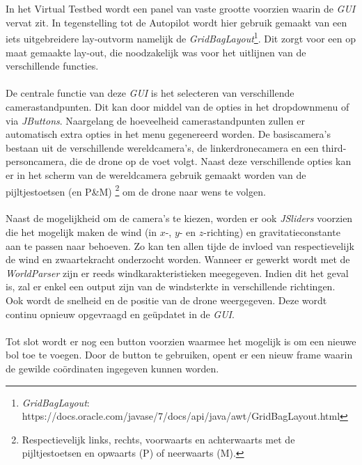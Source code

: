 \\
\\
In het Virtual Testbed wordt een panel van vaste grootte voorzien waarin de \textit{GUI} vervat zit. In tegenstelling tot de Autopilot wordt hier gebruik gemaakt van een iets uitgebreidere lay-outvorm namelijk de \textit{GridBagLayout}\footnote{\textit{GridBagLayout}: https://docs.oracle.com/javase/7/docs/api/java/awt/GridBagLayout.html}. Dit zorgt voor een op maat gemaakte lay-out, die noodzakelijk was voor het uitlijnen van de verschillende functies. 
\\
\\
De centrale functie van deze \textit{GUI} is het selecteren van verschillende camerastandpunten. Dit kan door middel van de opties in het dropdownmenu of via \textit{JButtons}. Naargelang de hoeveelheid camerastandpunten zullen er automatisch extra opties in het menu gegenereerd worden. De basiscamera's bestaan uit de verschillende wereldcamera's, de linkerdronecamera en een third-personcamera, die de drone op de voet volgt. Naast deze verschillende opties kan er in het scherm van de wereldcamera gebruik gemaakt worden van de pijltjestoetsen (en P\&M) \footnote{Respectievelijk links, rechts, voorwaarts en achterwaarts met de pijltjestoetsen en opwaarts (P) of neerwaarts (M).} om de drone naar wens te volgen. 
\\
\\
Naast de mogelijkheid om de camera's te kiezen, worden er ook \textit{JSliders} voorzien die het mogelijk maken de wind (in \(x\)-, \(y\)- en \(z\)-richting) en gravitatieconstante aan te passen naar behoeven. Zo kan ten allen tijde de invloed van respectievelijk de wind en zwaartekracht onderzocht worden. Wanneer er gewerkt wordt met de \textit{WorldParser} zijn er reeds windkarakteristieken meegegeven. Indien dit het geval is, zal er enkel een output zijn van de windsterkte in verschillende richtingen.
\\
Ook wordt de snelheid en de positie van de drone weergegeven. Deze wordt continu opnieuw opgevraagd en ge\"{u}pdatet in de \textit{GUI}. 
\\
\\
Tot slot wordt er nog een button voorzien waarmee het mogelijk is om een nieuwe bol toe te voegen. Door de button te gebruiken, opent er een nieuw frame waarin de gewilde co\"ordinaten ingegeven kunnen worden. 